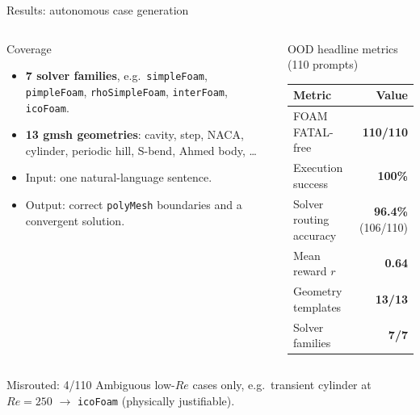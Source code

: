 \documentclass[aspectratio=169,10pt]{beamer}
\begin{document}
\begin{frame}{Results: autonomous case generation}
\begin{columns}[T,onlytextwidth]
\begin{block}{Coverage}
\begin{itemize}\small
  \item \textbf{7 solver families}, e.g.\ \texttt{simpleFoam}, \texttt{pimpleFoam}, \texttt{rhoSimpleFoam}, \texttt{interFoam}, \texttt{icoFoam}.
  \item \textbf{13 gmsh geometries}: cavity, step, NACA, cylinder, periodic hill, S-bend, Ahmed body, \dots
  \item Input: one natural-language sentence.
  \item Output: correct \texttt{polyMesh} boundaries and a convergent solution.
\end{itemize}
\end{block}
\begin{exampleblock}{OOD headline metrics (110 prompts)}
\centering\small
\begin{tabular}{lr}
\toprule
\textbf{Metric} & \textbf{Value} \\
\midrule
FOAM FATAL-free & \textbf{110/110} \\
Execution success & \textbf{100\%} \\
Solver routing accuracy & \textbf{96.4\%} (106/110) \\
Mean reward $r$ & \textbf{0.64} \\
Geometry templates & \textbf{13/13} \\
Solver families & \textbf{7/7} \\
\bottomrule
\end{tabular}
\end{exampleblock}
\end{columns}
\vspace{0.1cm}
\begin{alertblock}{Misrouted: 4/110}
\footnotesize Ambiguous low-$Re$ cases only, e.g.\ transient cylinder at $Re=250$ $\to$ \texttt{icoFoam} (physically justifiable).
\end{alertblock}
\end{frame}
\end{document}
